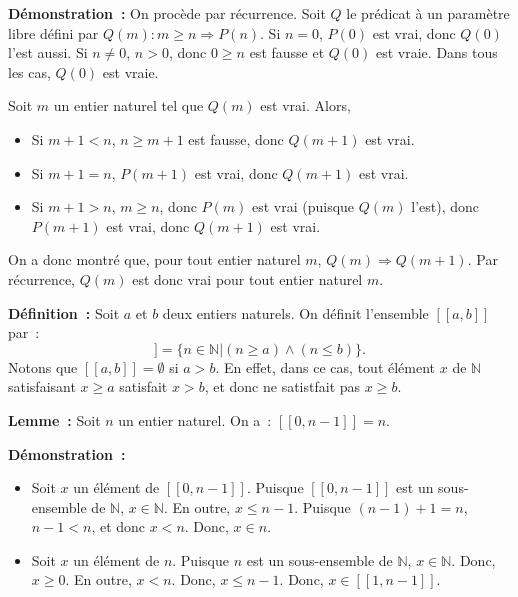 \medskip

\noindent\textbf{Démonstration :} On procède par récurrence. 
    Soit $Q$ le prédicat à un paramètre libre défini par $Q(m): m \geq n \Rightarrow P(n)$.
    Si $n = 0$, $P(0)$ est vrai, donc $Q(0)$ l'est aussi. 
    Si $n \neq 0$, $n > 0$, donc $0 \geq n$ est fausse et $Q(0)$ est vraie. 
    Dans  tous les cas, $Q(0)$ est vraie. 

    Soit $m$ un entier naturel tel que $Q(m)$ est vrai. 
    Alors, 
    \begin{itemize}[nosep]
        \item Si $m+1 < n$, $n \geq m+1$ est fausse, donc $Q(m+1)$ est vrai.
        \item Si $m+1 = n$, $P(m+1)$ est vrai, donc $Q(m+1)$ est vrai.
        \item Si $m+1 > n$, $m \geq n$, donc $P(m)$ est vrai (puisque $Q(m)$ l'est), donc $P(m+1)$ est vrai, donc $Q(m+1)$ est vrai.
    \end{itemize}
    On a donc montré que, pour tout entier naturel $m$, $Q(m) \Rightarrow Q(m+1)$. 
    Par récurrence, $Q(m)$ est donc vrai pour tout entier naturel $m$.

   \done 

\medskip

\noindent\textbf{Définition :} Soit $a$ et $b$ deux entiers naturels. 
    On définit l'ensemble $[\![a, b]\!]$ par : 
    \begin{equation*}
        [\![a, b]\!] = \lbrace n \in \mathbb{N} \vert (n \geq a) \wedge (n \leq b) \rbrace.
    \end{equation*}
    Notons que $[\![a, b]\!] = \emptyset$ si $a > b$. 
    En effet, dans ce cas, tout élément $x$ de $\mathbb{N}$ satisfaisant $x \geq a$ satisfait $x > b$, et donc ne satistfait pas $x \geq b$.

\medskip

\noindent\textbf{Lemme :} Soit $n$ un entier naturel. 
    On a : $[\![0, n-1]\!] = n$.

\medskip

\noindent\textbf{Démonstration :} 
\begin{itemize}[nosep]
    \item Soit $x$ un élément de $[\![0, n-1]\!]$. 
        Puisque $[\![0, n-1]\!]$ est un sous-ensemble de $\mathbb{N}$, $x \in \mathbb{N}$. 
        En outre, $x \leq n-1$.
        Puisque $(n-1)+1 = n$, $n-1 < n$, et donc $x < n$. 
        Donc, $x \in n$.
    \item Soit $x$ un élément de $n$. 
        Puisque $n$ est un sous-ensemble de $\mathbb{N}$, $x \in \mathbb{N}$. 
        Donc, $x \geq 0$.
        En outre, $x < n$.
        Donc, $x \leq n-1$. 
        Donc, $x \in [\![1,n-1]\!]$.
\end{itemize}

